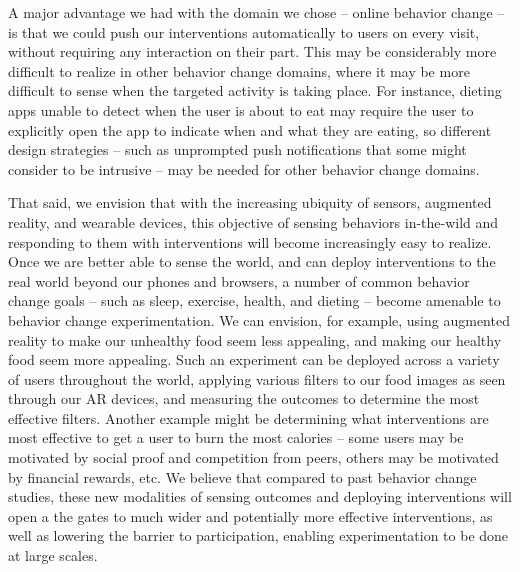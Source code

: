 A major advantage we had with the domain we chose -- online behavior change -- is that we could push our interventions automatically to users on every visit, without requiring any interaction on their part. This may be considerably more difficult to realize in other behavior change domains, where it may be more difficult to sense when the targeted activity is taking place. For instance, dieting apps unable to detect when the user is about to eat may require the user to explicitly open the app to indicate when and what they are eating, so different design strategies -- such as unprompted push notifications that some might consider to be intrusive -- may be needed for other behavior change domains.

That said, we envision that with the increasing ubiquity of sensors, augmented reality, and wearable devices, this objective of sensing behaviors in-the-wild and responding to them with interventions will become increasingly easy to realize. Once we are better able to sense the world, and can deploy interventions to the real world beyond our phones and browsers, a number of common behavior change goals -- such as sleep, exercise, health, and dieting -- become amenable to behavior change experimentation. We can envision, for example, using augmented reality to make our unhealthy food seem less appealing, and making our healthy food seem more appealing. Such an experiment can be deployed across a variety of users throughout the world, applying various filters to our food images as seen through our AR devices, and measuring the outcomes to determine the most effective filters. Another example might be determining what interventions are most effective to get a user to burn the most calories -- some users may be motivated by social proof and competition from peers, others may be motivated by financial rewards, etc. We believe that compared to past behavior change studies, these new modalities of sensing outcomes and deploying interventions will open a the gates to much wider and potentially more effective interventions, as well as lowering the barrier to participation, enabling experimentation to be done at large scales.


